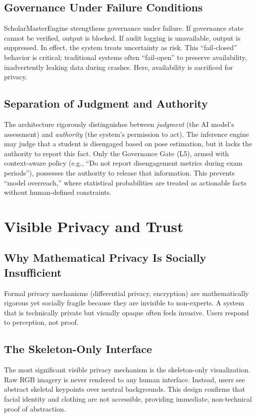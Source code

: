 \documentclass[conference]{IEEEtran}
\begin{document}
\subsection{Governance Under Failure Conditions}
ScholarMasterEngine strengthens governance under failure. If governance state cannot be verified, output is blocked. If audit logging is unavailable, output is suppressed. In effect, the system treats uncertainty as risk. This ``fail-closed'' behavior is critical; traditional systems often ``fail-open'' to preserve availability, inadvertently leaking data during crashes. Here, availability is sacrificed for privacy.

\subsection{Separation of Judgment and Authority}
The architecture rigorously distinguishes between \textit{judgment} (the AI model's assessment) and \textit{authority} (the system's permission to act). The inference engine may judge that a student is disengaged based on pose estimation, but it lacks the authority to report this fact. Only the Governance Gate (L5), armed with context-aware policy (e.g., ``Do not report disengagement metrics during exam periods''), possesses the authority to release that information. This prevents ``model overreach,'' where statistical probabilities are treated as actionable facts without human-defined constraints.

\section{Visible Privacy and Trust}

\subsection{Why Mathematical Privacy Is Socially Insufficient}
Formal privacy mechanisms (differential privacy, encryption) are mathematically rigorous yet socially fragile because they are invisible to non-experts. A system that is technically private but visually opaque often feels invasive. Users respond to perception, not proof.

\subsection{The Skeleton-Only Interface}
The most significant visible privacy mechanism is the skeleton-only visualization. Raw RGB imagery is never rendered to any human interface. Instead, users see abstract skeletal keypoints over neutral backgrounds. This design confirms that facial identity and clothing are not accessible, providing immediate, non-technical proof of abstraction.
\end{document}

